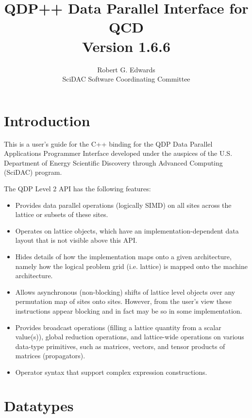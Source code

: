 \documentclass[12pt,letterpaper]{article}
\newcommand{\cpp}{C++}
\begin{document}
\title{
   QDP++ Data Parallel Interface for QCD  \\{\large Version 1.6.6}
}
\author{Robert G. Edwards\\
SciDAC Software Coordinating Committee}

\maketitle
\section{Introduction}
This is a user's guide for the \cpp{} binding for the QDP Data Parallel
Applications Programmer Interface developed under the auspices of the
U.S. Department of Energy Scientific Discovery through Advanced
Computing (SciDAC) program.

The QDP Level 2 API has the following features:
\begin{itemize}
\item Provides data parallel operations (logically SIMD) on all sites
across the lattice or subsets of these sites.
\item Operates on lattice objects, which have an
implementation-dependent data layout that is not visible above this
API.
\item Hides details of how the implementation maps onto a given
architecture, namely how the logical problem grid (i.e. lattice) is
mapped onto the machine architecture.
\item Allows asynchronous (non-blocking) shifts of lattice level
objects over any permutation map of sites onto sites. However, from
the user's view these instructions appear blocking and in fact may be
so in some implementation.
\item Provides broadcast operations (filling a lattice quantity from a
scalar value(s)), global reduction operations, and lattice-wide
operations on various data-type primitives, such as matrices, vectors,
and tensor products of matrices (propagators).
\item
Operator syntax that support complex expression constructions.
\end{itemize}

\section{Datatypes}
\label{sec.datatypes}
\end{document}
